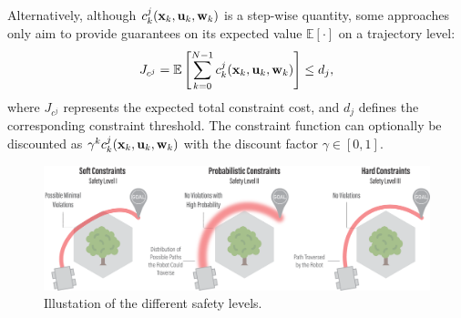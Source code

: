 \documentclass{article}
\begin{document}
\noindent Alternatively, although $c^j_k(\mathbf{x}_k, \mathbf{u}_k, \mathbf{w}_k)$ is a step-wise quantity, some approaches only aim to provide guarantees on its expected value $\mathbb{E}[\cdot]$ on a trajectory level:
\begin{equation} \label{eq:expected_constraint}
    J_{c^j} = \mathbb{E} \left[ \sum^{N - 1}_{k = 0} c^j_k(\mathbf{x}_k, \mathbf{u}_k, \mathbf{w}_k) \right] \leq d_j,
\end{equation}
where $J_{c^j}$ represents the expected total constraint cost, and $d_j$ defines the corresponding constraint threshold.
The constraint function can optionally be discounted as $\gamma^k c^j_k(\mathbf{x}_k, \mathbf{u}_k, \mathbf{w}_k)$ with the discount factor $\gamma \in [0, 1]$.

\begin{figure}[h]
    \centering
    \includegraphics[width=1.0\textwidth]{imgs/safety_definition.pdf}
    \caption{Illustation of the different safety levels.}
\end{figure}
\end{document}
